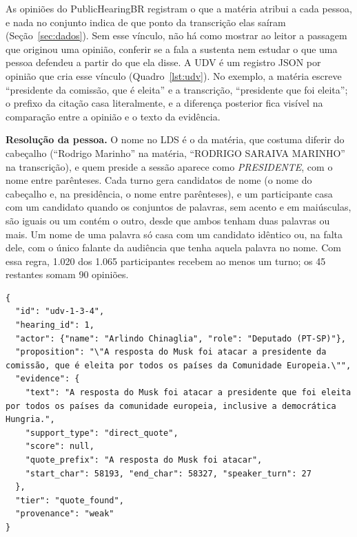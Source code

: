 As opiniões do PublicHearingBR registram o que a matéria atribui a cada pessoa, e nada no conjunto
indica de que ponto da transcrição elas saíram (Seção~\ref{sec:dados}). Sem esse vínculo, não há como
mostrar ao leitor a passagem que originou uma opinião, conferir se a fala a sustenta nem estudar o que
uma pessoa defendeu a partir do que ela disse. A UDV é um registro JSON por opinião que cria esse
vínculo (Quadro~\ref{lst:udv}). No exemplo, a matéria escreve ``presidente da comissão, que é
eleita'' e a transcrição, ``presidente que foi eleita''; o prefixo da citação casa literalmente, e a
diferença posterior fica visível na comparação entre a opinião e o texto da evidência.

\textbf{Resolução da pessoa.} O nome no LDS é o da matéria, que costuma diferir do cabeçalho
(``Rodrigo Marinho'' na matéria, ``RODRIGO SARAIVA MARINHO'' na transcrição), e quem preside a sessão
aparece como \textit{PRESIDENTE}, com o nome entre parênteses. Cada turno gera candidatos de nome (o
nome do cabeçalho e, na presidência, o nome entre parênteses), e um participante casa com um candidato
quando os conjuntos de palavras, sem acento e em maiúsculas, são iguais ou um contém o outro, desde que
ambos tenham duas palavras ou mais. Um nome de uma palavra só casa com um candidato idêntico ou, na
falta dele, com o único falante da audiência que tenha aquela palavra no nome. Com essa regra, 1.020
dos 1.065 participantes recebem ao menos um turno; os 45 restantes somam 90 opiniões.

\begin{lstlisting}[float=tbp,caption={Uma UDV. Os offsets de caracteres apontam para a transcrição da
audiência 1, e o turno de fala é identificado pelo seu índice na transcrição. Os campos que registram o
codificador e o corte usados foram omitidos.},label=lst:udv]
{
  "id": "udv-1-3-4",
  "hearing_id": 1,
  "actor": {"name": "Arlindo Chinaglia", "role": "Deputado (PT-SP)"},
  "proposition": "\"A resposta do Musk foi atacar a presidente da comissão, que é eleita por todos os países da Comunidade Europeia.\"",
  "evidence": {
    "text": "A resposta do Musk foi atacar a presidente que foi eleita por todos os países da comunidade europeia, inclusive a democrática Hungria.",
    "support_type": "direct_quote",
    "score": null,
    "quote_prefix": "A resposta do Musk foi atacar",
    "start_char": 58193, "end_char": 58327, "speaker_turn": 27
  },
  "tier": "quote_found",
  "provenance": "weak"
}
\end{lstlisting}

